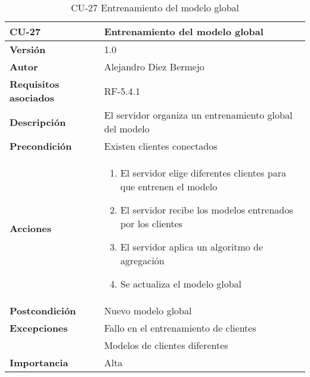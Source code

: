 \begin{table}[p]
	\centering
	\begin{tabularx}{\linewidth}{ p{} p{} }
		\toprule
		\textbf{CU-27}    & \textbf{Entrenamiento del modelo global}\\
		\toprule
		\textbf{Versión}              & 1.0    \\
		\textbf{Autor}                & Alejandro Diez Bermejo \\
		\textbf{Requisitos asociados} & RF-5.4.1 \\
		\textbf{Descripción}          & El servidor organiza un entrenamiento global del modelo \\
        \textbf{Precondición}         & Existen clientes conectados \\
		\textbf{Acciones}             &
		\begin{enumerate}
			\def\labelenumi{\arabic{enumi}.}
			\tightlist
            \item El servidor elige diferentes clientes para que entrenen el modelo
            \item El servidor recibe los modelos entrenados por los clientes
            \item El servidor aplica un algoritmo de agregación 
            \item Se actualiza el modelo global
		\end{enumerate}\\
		\textbf{Postcondición}        & Nuevo modelo global \\
		\textbf{Excepciones}          & Fallo en el entrenamiento de clientes \\
                                      & Modelos de clientes diferentes \\
		\textbf{Importancia}          & Alta \\
		\bottomrule
	\end{tabularx}
	\caption{CU-27 Entrenamiento del modelo global}
\end{table}

